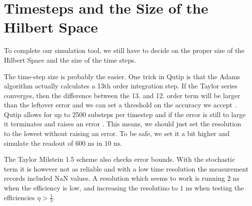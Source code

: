 







\section{Timesteps and the Size of the Hilbert Space}\label{sec:hilbert_space}
To complete our simulation tool, we still have to decide on the proper size of the Hilbert Space and the size of the time steps. 

The time-step size is probably the easier. One trick in Qutip is that the Adams algorithm actually calculates a 13th order integration step. If the Taylor series converges, then the difference between the 13. and 12. order term will be larger than the leftover error and we can set a threshold on the accuracy we accept \cite{KALKULUS}. Qutip allows for up to 2500 substeps per timestep and if the error is still to large it terminates and raises an error \cite{johansson_qutip_2012}. This means, we should just set the resolution to the lowest without raising an error. To be safe, we set it a bit higher and simulate the readout of $600 \text{ ns}$ in $10 \text{ ns}$. %

The Taylor Milstein 1.5 scheme also checks error bounds. With the stochastic term it is however not as reliable and with a low time resolution the measurement records included NaN values. A resolution which seems to work is running $2 \text{ ns}$ when the efficiency is low, and increasing the resolutino to $1 \text{ ns}$ when testing the efficiencies $\eta > \frac13$. 

